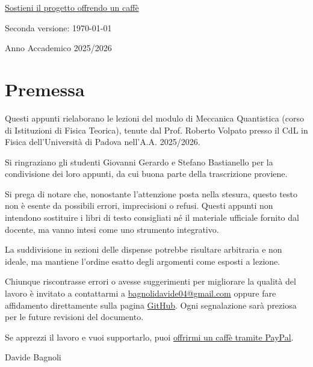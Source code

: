 \documentclass[12pt,a4paper,parskip=half,DIV=14,oneside,chapterprefix=true]{scrreprt}
\begin{document}
\begin{titlepage}
    {\small \href{https://paypal.me/DavideBagnoli04}{Sostieni il progetto offrendo un caffè}}
    \vspace{0.5cm}

    {\small Seconda versione: \today \par} 
    \vspace{0.5cm}

    {\Large Anno Accademico 2025/2026}
    
\end{titlepage}


\tableofcontents
\newpage

\chapter*{Premessa}

Questi appunti rielaborano le lezioni del modulo di Meccanica Quantistica (corso di Istituzioni di Fisica Teorica), tenute dal Prof. Roberto Volpato presso il CdL in Fisica dell'Università di Padova nell'A.A. 2025/2026.

Si ringraziano gli studenti Giovanni Gerardo e Stefano Bastianello per la condivisione dei loro appunti, da cui buona parte della trascrizione proviene.

\begin{attention}
    Si prega di notare che, nonostante l'attenzione posta nella stesura, questo testo non è esente da possibili errori, imprecisioni o refusi. Questi appunti non intendono sostituire i libri di testo consigliati né il materiale ufficiale fornito dal docente, ma vanno intesi come uno strumento integrativo.
\end{attention}
La suddivisione in sezioni delle dispense potrebbe risultare arbitraria e non ideale, ma mantiene l'ordine esatto degli argomenti come esposti a lezione.

Chiunque riscontrasse errori o avesse suggerimenti per migliorare la qualità del lavoro è invitato a contattarmi a \href{bagnolidavide04@gmail.com}{bagnolidavide04@gmail.com} oppure fare affidamento direttamente sulla pagina \href{https://github.com/bagnolino/appunti-meccanica-quantistica.git}{GitHub}. Ogni segnalazione sarà preziosa per le future revisioni del documento.

Se apprezzi il lavoro e vuoi supportarlo, puoi \href{https://paypal.me/DavideBagnoli04}{offrirmi un caffè tramite PayPal}.

\vspace{2cm}
\hfill Davide Bagnoli











\listoflezioni
\end{document}
